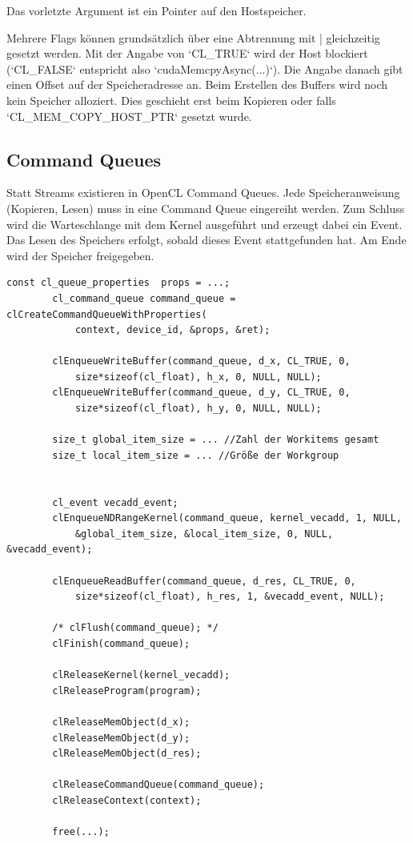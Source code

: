 			Das vorletzte Argument ist ein Pointer auf den Hostspeicher.
			
			Mehrere Flags können grundsätzlich über eine Abtrennung mit | gleichzeitig gesetzt werden. Mit der Angabe von \li`CL_TRUE` wird der Host blockiert (\li`CL_FALSE` entspricht also \li`cudaMemcpyAsync(...)`). Die Angabe danach gibt einen Offset auf der Speicheradresse an. Beim Erstellen des Buffers wird noch kein Speicher alloziert. Dies geschieht erst beim Kopieren oder falls \li`CL_MEM_COPY_HOST_PTR` gesetzt wurde.
							
			\subsection{Command Queues}
			Statt \Glspl{Stream} existieren in OpenCL \Glspl{Command Queue}. Jede Speicheranweisung (Kopieren, Lesen) muss in eine \Gls{Command Queue} eingereiht werden. Zum Schluss wird die Warteschlange mit dem \Gls{Kernel} ausgeführt und erzeugt dabei ein Event. Das Lesen des Speichers erfolgt, sobald dieses Event stattgefunden hat. Am Ende wird der Speicher freigegeben.
			
            \begin{lstlisting}[caption=Command Queues und Clean-Up]
        const cl_queue_properties  props = ...; 
        cl_command_queue command_queue = clCreateCommandQueueWithProperties(
            context, device_id, &props, &ret);

        clEnqueueWriteBuffer(command_queue, d_x, CL_TRUE, 0, 
            size*sizeof(cl_float), h_x, 0, NULL, NULL);	
        clEnqueueWriteBuffer(command_queue, d_y, CL_TRUE, 0,
            size*sizeof(cl_float), h_y, 0, NULL, NULL);			
				
        size_t global_item_size = ... //Zahl der Workitems gesamt
        size_t local_item_size = ... //Größe der Workgroup
        
        
        cl_event vecadd_event;
        clEnqueueNDRangeKernel(command_queue, kernel_vecadd, 1, NULL, 
            &global_item_size, &local_item_size, 0, NULL, &vecadd_event);
		
        clEnqueueReadBuffer(command_queue, d_res, CL_TRUE, 0, 
            size*sizeof(cl_float), h_res, 1, &vecadd_event, NULL);  
			
        /* clFlush(command_queue); */
        clFinish(command_queue);
		
        clReleaseKernel(kernel_vecadd);
        clReleaseProgram(program);
  
        clReleaseMemObject(d_x);
        clReleaseMemObject(d_y);
        clReleaseMemObject(d_res);

        clReleaseCommandQueue(command_queue);
        clReleaseContext(context);

        free(...);
            \end{lstlisting}
		
